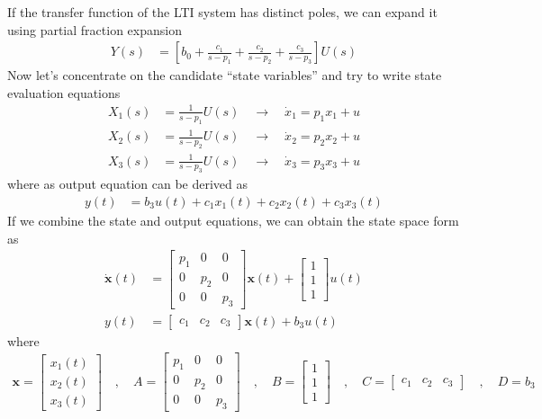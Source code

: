 \documentclass[twoside]{article}
\begin{document}
If the transfer function of the LTI system 
has distinct poles, we can expand it 
using partial fraction expansion 
%
\begin{align*}
Y(s) &= \left[ b_0 + \frac{c_1}{s - p_1} + \frac{c_2}{s - p_2} 
+ \frac{c_3}{s - p_3} \right] U(s)
\end{align*}
%
Now let's concentrate on the candidate ``state variables''
and try to write state evaluation equations
%
\begin{align*}
X_1(s) &= \frac{1}{s - p_1} U(s) \quad \rightarrow \quad \dot{x}_1 =  p_1 x_1+ u
\\
X_2(s) &= \frac{1}{s - p_2} U(s) \quad \rightarrow \quad \dot{x}_2 = p_2 x_2+ u
\\
X_3(s) &= \frac{1}{s - p_3} U(s) \quad \rightarrow \quad \dot{x}_3 = p_3 x_3 + u
\end{align*}
%
where as output equation can be derived as
%
\begin{align*}
y(t) &= b_3 u(t) + c_1 x_1(t) + c_2 x_2(t) + c_3 x_3(t)
\end{align*}
%
If we combine the state and output equations, we
can obtain the state space form as
%
%
\begin{align*}
  \dot{\mathbf{x}}(t) &= \left[ \begin{array}{ccc} p_1 & 0 & 0\\ 0 & p_2 & 0
    \\ 0 & 0 & p_3 \end{array} \right] \mathbf{x}(t)
   + 
  \left[ \begin{array}{c} 1 \\ 1
    \\ 1 \end{array} \right] u(t)
\\
y(t) &= \left[ \begin{array}{ccc} c_1 & c_2 & c_3 \end{array} \right] \mathbf{x}(t)
+ b_3 u(t)
\end{align*}
%
where 
%
\begin{align*}
\mathbf{x} = \left[ \begin{array}{c} x_1(t) \\ x_2(t) \\
x_3(t) \end{array} \right] \quad , \quad
A = \left[ \begin{array}{ccc} p_1 & 0 & 0 \\ 0 & p_2 & 0
    \\ 0 & 0 & p_3 \end{array} \right]
\quad , \quad 
B = \left[ \begin{array}{c} 1 \\ 1
    \\ 1 \end{array} \right]
\quad , \quad
C = \left[ \begin{array}{ccc} c_1 & c_2 & c_3 \end{array} \right]
\quad , \quad
D = b_3
\end{align*}
%
\end{document}
